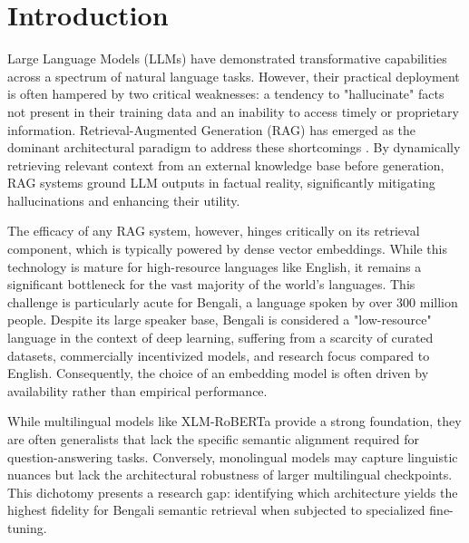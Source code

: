 \documentclass[manuscript,screen,review]{acmart}
\begin{document}
\maketitle

\section{Introduction}

Large Language Models (LLMs) have demonstrated transformative capabilities across a spectrum of natural language tasks. However, their practical deployment is often hampered by two critical weaknesses: a tendency to "hallucinate" facts not present in their training data and an inability to access timely or proprietary information. Retrieval-Augmented Generation (RAG) has emerged as the dominant architectural paradigm to address these shortcomings \cite{lewis2020retrieval, gao2023survey}. By dynamically retrieving relevant context from an external knowledge base before generation, RAG systems ground LLM outputs in factual reality, significantly mitigating hallucinations and enhancing their utility.

The efficacy of any RAG system, however, hinges critically on its retrieval component, which is typically powered by dense vector embeddings. While this technology is mature for high-resource languages like English, it remains a significant bottleneck for the vast majority of the world's languages. This challenge is particularly acute for Bengali, a language spoken by over 300 million people. Despite its large speaker base, Bengali is considered a "low-resource" language in the context of deep learning, suffering from a scarcity of curated datasets, commercially incentivized models, and research focus compared to English. Consequently, the choice of an embedding model is often driven by availability rather than empirical performance.

While multilingual models like XLM-RoBERTa \cite{conneau2019unsupervised} provide a strong foundation, they are often generalists that lack the specific semantic alignment required for question-answering tasks. Conversely, monolingual models may capture linguistic nuances but lack the architectural robustness of larger multilingual checkpoints. This dichotomy presents a research gap: identifying which architecture yields the highest fidelity for Bengali semantic retrieval when subjected to specialized fine-tuning.
\end{document}
